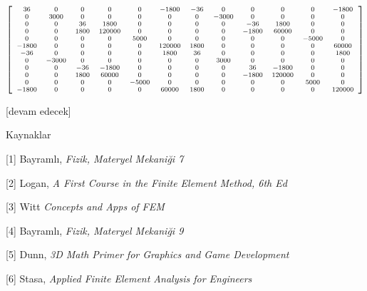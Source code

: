 \documentclass[12pt,fleqn]{article}\usepackage{../../common}
\begin{document}
$$  
\scriptsize
\left[\begin{array}{cccccccccccc}36 & 0 & 0 & 0 & 0 & -1800 & -36 & 0 & 0 & 0 &
    0 & -1800\\0 & 3000 & 0 & 0 & 0 & 0 & 0 & -3000 & 0 & 0 & 0 & 0\\0 & 0 & 36
    & 1800 & 0 & 0 & 0 & 0 & -36 & 1800 & 0 & 0\\0 & 0 & 1800 & 120000 & 0 & 0 &
    0 & 0 & -1800 & 60000 & 0 & 0\\0 & 0 & 0 & 0 & 5000 & 0 & 0 & 0 & 0 & 0 &
    -5000 & 0\\-1800 & 0 & 0 & 0 & 0 & 120000 & 1800 & 0 & 0 & 0 & 0 &
    60000\\-36 & 0 & 0 & 0 & 0 & 1800 & 36 & 0 & 0 & 0 & 0 & 1800\\0 & -3000 & 0
    & 0 & 0 & 0 & 0 & 3000 & 0 & 0 & 0 & 0\\0 & 0 & -36 & -1800 & 0 & 0 & 0 & 0
    & 36 & -1800 & 0 & 0\\0 & 0 & 1800 & 60000 & 0 & 0 & 0 & 0 & -1800 & 120000
    & 0 & 0\\0 & 0 & 0 & 0 & -5000 & 0 & 0 & 0 & 0 & 0 & 5000 & 0\\-1800 & 0 & 0
    & 0 & 0 & 60000 & 1800 & 0 & 0 & 0 & 0 & 120000\end{array}\right]
$$











  
[devam edecek]

Kaynaklar

[1] Bayramlı, {\em Fizik, Materyel Mekaniği 7}

[2] Logan, {\em A First Course in the Finite Element Method, 6th Ed}

[3] Witt {\em Concepts and Apps of FEM}

[4] Bayramlı, {\em Fizik, Materyel Mekaniği 9}

[5] Dunn, {\em 3D Math Primer for Graphics and Game Development}

[6] Stasa, {\em Applied Finite Element Analysis for Engineers}
\end{document}
